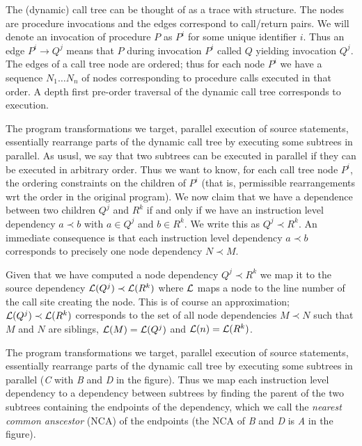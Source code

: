 \documentclass{acm_proc_article-sp}
\begin{document}
The (dynamic) call tree can be thought of as a trace with structure. The nodes
are procedure invocations and the edges correspond to call/return pairs.
We will denote an invocation of procedure $P$ as $P^i$ for some unique 
identifier $i$. Thus an edge $P^i \rightarrow Q^j$ means that $P$
during invocation $P^i$ called $Q$ yielding invocation $Q^j$. The edges of a
call tree node are ordered; thus for each node $P^i$ we have a sequence
$N_1 \ldots N_n$ of nodes corresponding to procedure calls executed in
that order. A depth first pre-order traversal of the dynamic call tree
corresponds to execution.

The program transformations we target, parallel execution of source statements,
essentially rearrange parts of the dynamic call tree by executing some subtrees 
in parallel. As ususl, we say that two subtrees can be executed in parallel
if they can be executed in arbitrary order. Thus we want to know, for each
call tree node $P^i$, the ordering constraints on the children of $P^i$ (that
is, permissible rearrangements wrt the order in the original program). We
now claim that we have a dependence between two children $Q^j$ and $R^k$ if
and only if we have an instruction level dependency $a \prec b$ with
$a \in Q^j$ and $b \in R^k$. We write this as $Q^j \prec R^k$. 
An immediate consequence is that each instruction level dependency $a \prec b$
corresponds to precisely one node dependency $N \prec M$.

\newcommand{\li}{{\cal L}}
Given that we have computed a node dependency $Q^j \prec R^k$ we map it to
the source dependency $\li(Q^j) \prec \li(R^k)$ where $\li$ maps a node to the
line number of the call site creating the node. This is of course an
approximation; $\li(Q^j) \prec \li(R^k)$ corresponds to the set of all node
dependencies $M \prec N$ such that $M$ and $N$ are siblings, $\li(M)=\li(Q^j)$
and $\li(n)=\li(R^k)$.

The program transformations we target, parallel execution of source statements,
essentially rearrange parts of the dynamic call tree by executing some subtrees 
in parallel ({\it C} with {\it B} and {\it D} in the figure). Thus we map each 
instruction 
level dependency to a dependency between subtrees by finding the parent of the 
two subtrees containing the endpoints of the dependency, which we call the 
{\em nearest common anscestor} (NCA) of the endpoints (the NCA of {\it B} and
{\it D} is {\it A} in the figure). 
\end{document}
